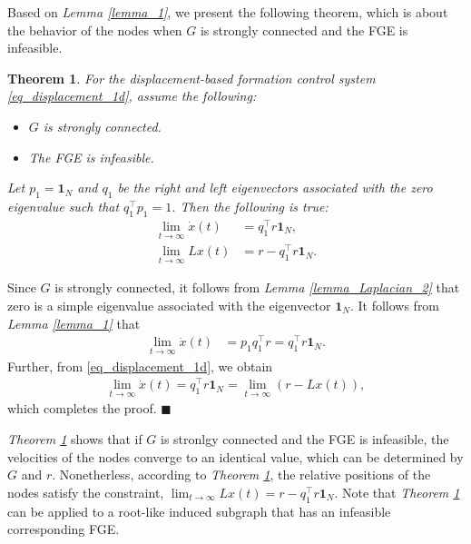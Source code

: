\documentclass{ifacconf}
\newtheorem{theorem}{Theorem}[section]
\begin{document}
Based on \textit{Lemma \ref{lemma_1}}, we present the following theorem, which is about the behavior of the nodes when $G$ is strongly connected and the FGE is infeasible.
\begin{theorem} \label{thm_main}
For the displacement-based formation control system \eqref{eq_displacement_1d}, assume the following:
\begin{itemize}
\item $G$ is strongly connected.
\item The FGE is infeasible.
\end{itemize}
Let $p_1 = \mathbf{1}_N$ and $q_1$ be the right and left eigenvectors associated with the zero eigenvalue such that $q_1^\top p_1 = 1$. Then the following is true: 
\begin{align*}
\lim_{t\rightarrow \infty} \dot{x}(t) &=  q_1^\top r \mathbf{1}_N, \\
\lim_{t \to \infty} Lx(t) &= r - q_1^\top r  \mathbf{1}_N.
\end{align*}
\end{theorem}
\begin{pf}
Since $G$ is strongly connected, it follows from \textit{Lemma \ref{lemma_Laplacian_2}} that zero is a simple eigenvalue associated with the eigenvector $\mathbf{1}_N$. It follows from \textit{Lemma \ref{lemma_1}} that 
\begin{align*}
\lim_{t\rightarrow \infty} \dot{x}(t) &= p_1 q_1^\top r = q_1^\top r  \mathbf{1}_N.
\end{align*}
Further, from \eqref{eq_displacement_1d}, we obtain
\begin{align*}
\lim_{t \to \infty} \dot{x}(t) = q_1^\top r  \mathbf{1}_N = \lim_{t\to \infty}(r-Lx(t)),
\end{align*}
which completes the proof. $\blacksquare$
\end{pf}

\textit{Theorem \ref{thm_main}} shows that if $G$ is stronlgy connected and the FGE is infeasible, the velocities of the nodes converge to an identical value, which can be determined by $G$ and $r$. Nonetherless, according to \textit{Theorem \ref{thm_main}}, the relative positions of the nodes satisfy the constraint, $\lim_{t \to \infty} Lx(t) = r - q_1^\top r  \mathbf{1}_N$. Note that \textit{Theorem \ref{thm_main}} can be applied to a root-like induced subgraph that has an infeasible corresponding FGE.
\end{document}
